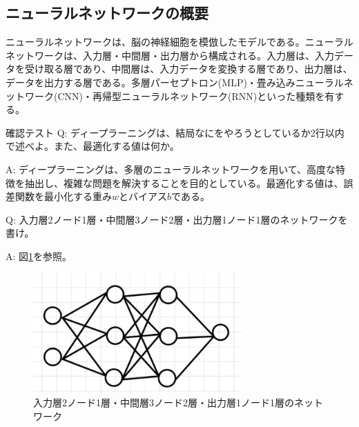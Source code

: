 \documentclass{ltjsarticle}
\begin{document}
\subsection{ニューラルネットワークの概要}
ニューラルネットワークは、脳の神経細胞を模倣したモデルである。ニューラルネットワークは、入力層・中間層・出力層から構成される。入力層は、入力データを受け取る層であり、中間層は、入力データを変換する層であり、出力層は、データを出力する層である。多層パーセプトロン(MLP)・畳み込みニューラルネットワーク(CNN)・再帰型ニューラルネットワーク(RNN)といった種類を有する。

\begin{itembox}[l]{確認テスト}
Q: ディープラーニングは、結局なにをやろうとしているか2行以内で述べよ。また、最適化する値は何か。

A: ディープラーニングは、多層のニューラルネットワークを用いて、高度な特徴を抽出し、複雑な問題を解決することを目的としている。最適化する値は、誤差関数を最小化する重み$w$とバイアス$b$である。

Q: 入力層2ノード1層・中間層3ノード2層・出力層1ノード1層のネットワークを書け。

A: 図\ref{fig:2-3-1}を参照。

\end{itembox}

\begin{figure}[htbp]
  \centering
  \includegraphics[width=8cm]{./capture/confirm_test/day1_01_1.png}
  \caption{入力層2ノード1層・中間層3ノード2層・出力層1ノード1層のネットワーク}
  \label{fig:2-3-1}
\end{figure}
\end{document}
